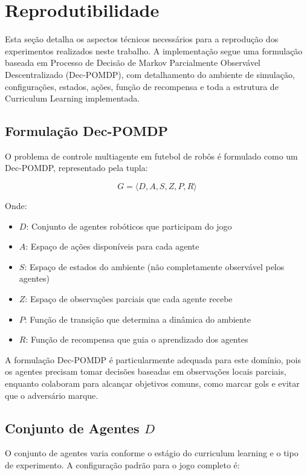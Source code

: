 \section{Reprodutibilidade}

Esta seção detalha os aspectos técnicos necessários para a reprodução dos experimentos realizados neste trabalho. A implementação segue uma formulação baseada em Processo de Decisão de Markov Parcialmente Observável Descentralizado (Dec-POMDP), com detalhamento do ambiente de simulação, configurações, estados, ações, função de recompensa e toda a estrutura de Curriculum Learning implementada.

\subsection{Formulação Dec-POMDP}

O problema de controle multiagente em futebol de robôs é formulado como um Dec-POMDP, representado pela tupla:

$$G = \langle D, A, S, Z, P, R \rangle$$

Onde:
\begin{itemize}
    \item $D$: Conjunto de agentes robóticos que participam do jogo
    \item $A$: Espaço de ações disponíveis para cada agente
    \item $S$: Espaço de estados do ambiente (não completamente observável pelos agentes)
    \item $Z$: Espaço de observações parciais que cada agente recebe
    \item $P$: Função de transição que determina a dinâmica do ambiente
    \item $R$: Função de recompensa que guia o aprendizado dos agentes
\end{itemize}

A formulação Dec-POMDP é particularmente adequada para este domínio, pois os agentes precisam tomar decisões baseadas em observações locais parciais, enquanto colaboram para alcançar objetivos comuns, como marcar gols e evitar que o adversário marque.

\subsection{Conjunto de Agentes $D$}

O conjunto de agentes varia conforme o estágio do curriculum learning e o tipo de experimento. A configuração padrão para o jogo completo é:

